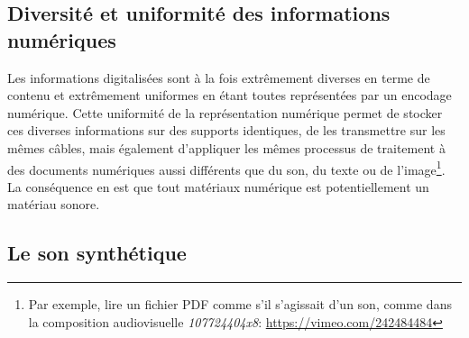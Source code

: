 \subsection{Diversité et uniformité des informations numériques}

\noindent Les informations digitalisées sont à la fois extrêmement diverses en terme de contenu et extrêmement uniformes en étant toutes représentées par un encodage numérique.
Cette uniformité de la représentation numérique permet de stocker ces diverses informations sur des supports identiques, de les transmettre sur les mêmes câbles, mais également d'appliquer les mêmes processus de traitement à des documents numériques aussi différents que du son, du texte ou de l'image\footnote{Par exemple, lire un fichier PDF comme s'il s'agissait d'un son, comme dans la composition audiovisuelle \textit{107724404x8}: \url{https://vimeo.com/242484484}}.
La conséquence en est que tout matériaux numérique est potentiellement un matériau sonore.

\subsection{Le son synthétique}

